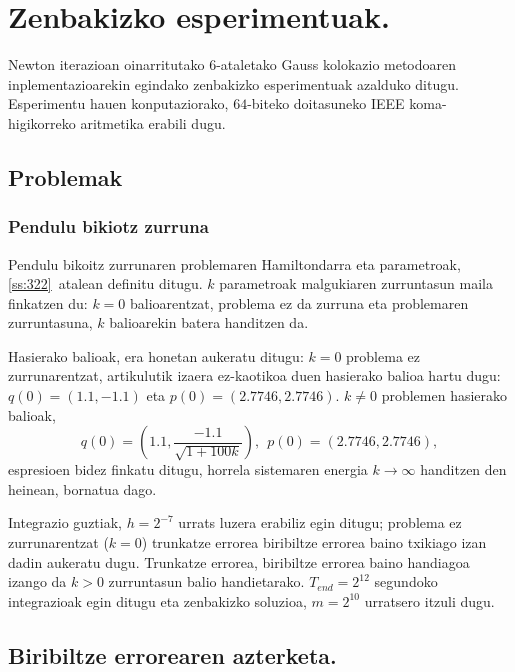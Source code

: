 \clearpage

\section{Zenbakizko esperimentuak.}
\label{sec:7.7}

\label{s:ne}

Newton iterazioan oinarritutako $6$-ataletako Gauss kolokazio metodoaren inplementazioarekin egindako zenbakizko esperimentuak azalduko ditugu. Esperimentu hauen konputaziorako, $64$-biteko doitasuneko IEEE koma-higikorreko aritmetika erabili dugu.

\subsection{Problemak}

\subsubsection*{Pendulu bikiotz zurruna}

Pendulu bikoitz zurrunaren problemaren Hamiltondarra eta parametroak, \ref{ss:322}~atalean definitu ditugu. $k$ parametroak malgukiaren zurruntasun maila finkatzen du: $k=0$ balioarentzat, problema ez da zurruna eta problemaren zurruntasuna, $k$ balioarekin batera handitzen da. 

Hasierako balioak, era honetan aukeratu ditugu: $k=0$ problema ez zurrunarentzat, \cite{Dumitru} artikulutik izaera ez-kaotikoa duen hasierako balioa hartu dugu: $q(0)=(1.1, -1.1)$ eta $p(0)=(2.7746,2.7746)$. $k\neq 0$ problemen hasierako balioak,
\begin{equation*}
q(0)=\left(1.1, \frac{-1.1}{\sqrt{1+100k}}\right), \ \ 
p(0)=(2.7746,2.7746),
\end{equation*}
espresioen bidez finkatu  ditugu, horrela sistemaren energia $k \rightarrow \infty$ handitzen den heinean, bornatua dago.

Integrazio guztiak, $h=2^{-7}$ urrats luzera erabiliz egin ditugu; problema ez zurrunarentzat ($k=0$) trunkatze errorea biribiltze errorea baino txikiago izan dadin aukeratu dugu. Trunkatze errorea, biribiltze errorea baino handiagoa izango da $k>0$ zurruntasun balio handietarako. $T_{end}=2^{12}$ segundoko integrazioak egin ditugu eta zenbakizko soluzioa, $m=2^{10}$ urratsero itzuli dugu. 

\subsection{Biribiltze errorearen azterketa.}

